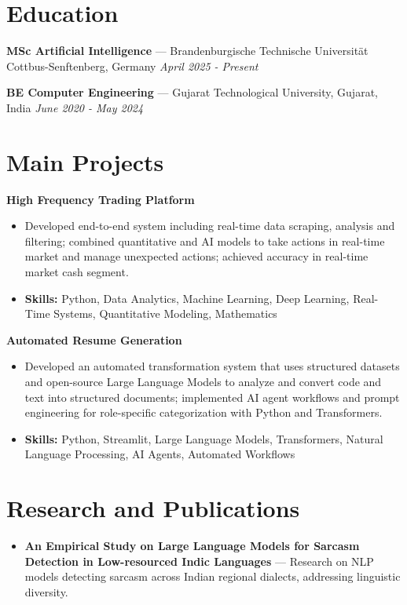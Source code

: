 \documentclass[a4paper,10pt]{article}
\begin{document}
\section*{Education}
\textbf{MSc Artificial Intelligence} — Brandenburgische Technische Universität Cottbus-Senftenberg, Germany \hfill \textit{April 2025 - Present}\par
\vspace{1.5pt}
\textbf{BE Computer Engineering} — Gujarat Technological University, Gujarat, India \hfill \textit{June 2020 - May 2024}\par

\section*{Main Projects}
\textbf{High Frequency Trading Platform}\par
\vspace{1pt}
\begin{itemize}
  \item Developed end-to-end system including real-time data scraping, analysis and filtering; combined quantitative and AI models to take actions in real-time market and manage unexpected actions; achieved accuracy in real-time market cash segment.
  \item \textbf{Skills:} Python, Data Analytics, Machine Learning, Deep Learning, Real-Time Systems, Quantitative Modeling, Mathematics
\end{itemize}
\vspace{3pt}
\textbf{Automated Resume Generation}\par
\vspace{1pt}
\begin{itemize}
  \item Developed an automated transformation system that uses structured datasets and open-source Large Language Models to analyze and convert code and text into structured documents; implemented AI agent workflows and prompt engineering for role-specific categorization with Python and Transformers.
  \item \textbf{Skills:} Python, Streamlit, Large Language Models, Transformers, Natural Language Processing, AI Agents, Automated Workflows
\end{itemize}

\section*{Research and Publications}
\begin{itemize}
\item \textbf{An Empirical Study on Large Language Models for Sarcasm Detection in Low-resourced Indic Languages} — Research on NLP models detecting sarcasm across Indian regional dialects, addressing linguistic diversity.
\end{itemize}
\end{document}
